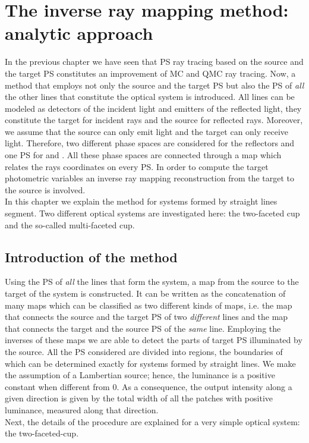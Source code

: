 \chapter{The inverse ray mapping method: analytic approach}\label{chap:raymapping1}
In the previous chapter we have seen that PS ray tracing based on the source and the target PS constitutes an improvement of MC and QMC ray tracing. 
Now, a method that employs not only the source and the target PS but also the PS of \textit{all} the other lines that constitute the optical system is introduced. 
All lines can be modeled as detectors of the incident light and emitters of the reflected light, they constitute
the target for incident rays and the source for reflected rays.
Moreover, we assume that the source can only emit light and the target can only receive light.
Therefore, two different phase spaces are considered for the reflectors and one PS for
 and . All these phase spaces are connected through a map which relates the rays coordinates on every PS. In order to compute the target photometric variables an inverse ray mapping reconstruction from the target to the source is involved.
\\\indent
In this chapter we explain the method for systems formed by straight lines segment. 
Two different optical systems are investigated here: the two-faceted cup and the so-called multi-faceted cup.
\section{Introduction of the method}
Using the PS of \textit{all} the lines that form the system, a map from the source to the target of the system is constructed. It can be written as the concatenation of many maps which can be classified as two different kinds of maps, i.e. the map that connects the source and the target PS of two \textit{different} lines and the map that connects the target and the source PS of the \textit{same} line.
Employing the inverses of these maps we are able to detect the parts of target PS illuminated by the source.
All the PS considered are divided into regions, the boundaries of which can be determined exactly for systems formed by straight lines.
We make the assumption of a Lambertian source; hence, the luminance is a positive constant when different from $0$. 
As a consequence, the output intensity along a given direction is given by the total width of all the patches with positive luminance, measured along that direction.\\ \indent Next, the details of the procedure are explained for a very simple optical system: the two-faceted-cup.
